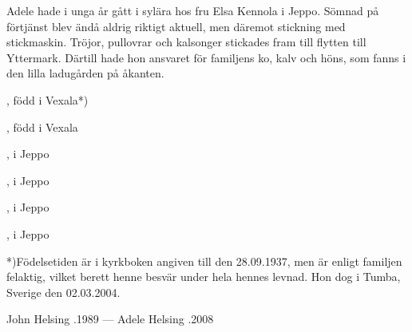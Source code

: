 Adele hade i unga år gått i sylära hos fru Elsa Kennola i Jeppo.	Sömnad på förtjänst blev ändå aldrig riktigt aktuell, men däremot	stickning med stickmaskin. Tröjor, pullovrar och kalsonger stickades fram till flytten till Yttermark. Därtill hade hon ansvaret för familjens ko, kalv och höns, som fanns i den lilla ladugården på åkanten.
\begin{jhchildren}
  \item {}, född i Vexala*)
  \item {}, född i Vexala
  \item {}, i Jeppo
  \item {}, i Jeppo
  \item {}, i Jeppo
  \item {}, i Jeppo
\end{jhchildren}

*)Födelsetiden är i kyrkboken angiven till den 28.09.1937, men är	enligt familjen felaktig, vilket berett henne besvär under hela hennes	levnad. Hon dog i Tumba, Sverige den 02.03.2004.

John Helsing .1989  ---  Adele Helsing .2008
